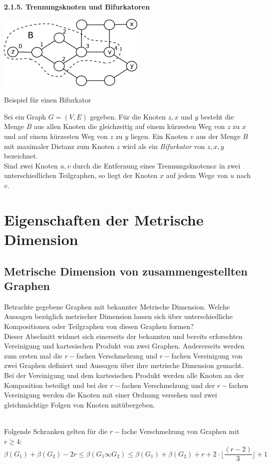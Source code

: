 \textbf{2.1.5. Trennungsknoten und Bifurkatoren}
\begin{floatingfigure}[l]{200pt}
\centering
\includegraphics*[width = 200pt]{bilder/bifurkator.pdf}
\caption{Beispiel für einen Bifurkator}
\label{bild:bifurkator}
\end{floatingfigure}  	 
\vspace{-2mm}
Sei ein Graph $G=(V,E)$ gegeben. Für die Knoten $z,x$ und $y$ besteht die Menge $B$ aus allen Knoten die gleichzeitig auf einem kürzesten Weg von $z$ zu $x$ und auf einem kürzesten Weg von $z$ zu $y$ liegen. Ein Knoten $v$ aus der Menge $B$ mit maximaler Distanz zum Knoten $z$ wird als ein \emph{Bifurkator} von $z, x, y$ bezeichnet.\\
Sind zwei Knoten $u,v$ durch die Entfernung eines Trennungsknotens$x$ in zwei unterschiedlichen Teilgraphen, so liegt der Knoten $x$ auf jedem Wege von $u$ nach $v$.
\section{Eigenschaften der Metrische Dimension}
\subsection{Metrische Dimension von zusammengestellten Graphen}
Betrachte gegebene Graphen mit bekannter Metrische Dimension. Welche Aussagen bezüglich metrischer Dimension lassen sich über unterschiedliche Kompositionen oder Teilgraphen von diesen Graphen formen?\\Dieser Abschnitt widmet sich einerseits der bekannten und bereits erforschten Vereinigung und kartesischen Produkt von zwei Graphen. Andererseits werden zum ersten mal die $r-$fachen Verschmelzung und $r-$fachen Vereinigung von zwei Graphen definiert und Aussagen über ihre metrische Dimension gemacht.\\Bei der Vereinigung und dem kartesischen Produkt werden alle Knoten an der Komposition beteiligt und bei der $r-$fachen Verschmelzung und der $r-$fachen Vereinigung werden die Knoten mit einer Ordnung versehen und zwei gleichmächtige Folgen von Knoten mitübergeben.   
\begin{lem}$\;\;$\\Folgende Schranken gelten für die $r-$fache Verschmelzung von Graphen mit $r \geq 4$:
$$\beta(G_1)+\beta(G_2)-2r \leq \beta(G_1 \infty G_2) \leq \beta(G_1)+\beta(G_2)+r+2 \cdot \lfloor\frac{(r-2)}{3}\rfloor+1$$
\end{lem}

